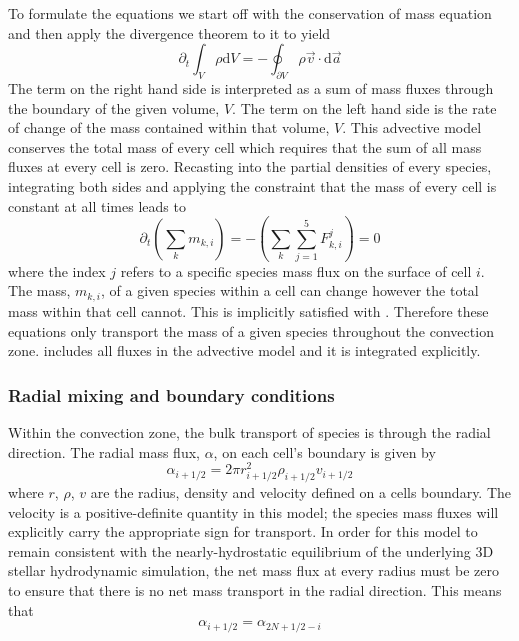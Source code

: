 \documentclass[fleqn,usenatbib]{mnras}
\begin{document}
To formulate the equations we start off with the conservation of mass equation
and then apply the divergence theorem to it to yield
%
\begin{equation}
  \label{eq:masscons}
  \partial_{t} \int_{V} \rho \mathrm{d}V = - \oint_{\partial V} \rho \vec{v} \cdot \mathrm{d}\vec{a}
\end{equation}
%
The term on the right hand side is interpreted as a sum of mass fluxes through
the boundary of the given volume, $V$. The term on the left hand side is the rate of
change of the mass contained within that volume, $V$. This advective model conserves
the total mass of every cell which requires that the sum of all mass fluxes at
every cell is zero. Recasting  into the partial densities of every
species, integrating both sides and applying the constraint that the mass of
every cell is constant at all times leads to
%
\begin{equation}
  \label{eq:fluxes0}
  \partial_{t} \left( \sum_{k} m_{k,i} \right) = - (\sum_{k}\sum_{j=1}^{5} F_{k,i}^{j}) = 0
\end{equation}
%
where the index $j$ refers to a specific species mass flux on the
surface of cell $i$. The mass, $m_{k,i}$, of a given species within a
cell can change however the total mass within that cell cannot. This
is implicitly satisfied with . Therefore these equations
only transport the mass of a given species throughout the convection
zone.  includes all fluxes in the advective model and it
is integrated explicitly.

\subsubsection{Radial mixing and boundary conditions}
\label{sec:radialMix}

Within the convection zone, the bulk transport of species is through the radial
direction. The radial mass flux, $\alpha$, on each cell's boundary is given by
%
\begin{equation}
  \label{eq:alpha}
  \alpha_{i+1/2} = 2 \pi r^{2}_{i+1/2} \rho_{i+1/2} v_{i+1/2}
\end{equation}
%
where $r$, $\rho$, $v$ are the radius, density and velocity defined on
a cells boundary. The velocity is a positive-definite quantity in this
model; the species mass fluxes will explicitly carry the appropriate
sign for transport. In order for this model to remain consistent with
the nearly-hydrostatic equilibrium of the underlying 3D stellar
hydrodynamic simulation, the net mass flux at every radius must be
zero to ensure that there is no net mass transport in the radial
direction. This means that
%
\begin{equation}
  \label{eq:fluxlayer}
  \alpha_{i+1/2} = \alpha_{2N+1/2-i}
\end{equation}
%
\end{document}
